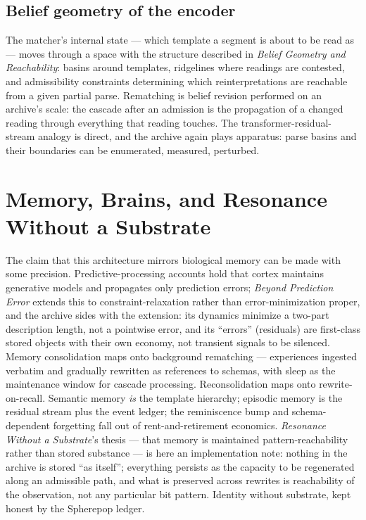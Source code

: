\documentclass[11pt,oneside]{book}
\theoremstyle{remark}
\begin{document}
\section{Belief geometry of the encoder}

The matcher's internal state --- which template a segment is about to be
read as --- moves through a space with the structure described in
\emph{Belief Geometry and Reachability}: basins around templates,
ridgelines where readings are contested, and admissibility constraints
determining which reinterpretations are reachable from a given partial
parse. Rematching is belief revision performed on an archive's scale:
the cascade after an admission is the propagation of a changed reading
through everything that reading touches. The transformer-residual-stream
analogy is direct, and the archive again plays apparatus: parse basins
and their boundaries can be enumerated, measured, perturbed.

\chapter{Memory, Brains, and Resonance Without a Substrate}

The claim that this architecture mirrors biological memory can be made
with some precision. Predictive-processing accounts hold that cortex
maintains generative models and propagates only prediction errors;
\emph{Beyond Prediction Error} extends this to constraint-relaxation
rather than error-minimization proper, and the archive sides with the
extension: its dynamics minimize a two-part description length, not a
pointwise error, and its ``errors'' (residuals) are first-class stored
objects with their own economy, not transient signals to be silenced.
Memory consolidation maps onto background rematching --- experiences
ingested verbatim and gradually rewritten as references to schemas, with
sleep as the maintenance window for cascade processing. Reconsolidation
maps onto rewrite-on-recall. Semantic memory \emph{is} the template
hierarchy; episodic memory is the residual stream plus the event ledger;
the reminiscence bump and schema-dependent forgetting fall out of
rent-and-retirement economics. \emph{Resonance Without a Substrate}'s
thesis --- that memory is maintained pattern-reachability rather than
stored substance --- is here an implementation note: nothing in the
archive is stored ``as itself''; everything persists as the capacity to
be regenerated along an admissible path, and what is preserved across
rewrites is reachability of the observation, not any particular bit
pattern. Identity without substrate, kept honest by the Spherepop
ledger.
\end{document}
